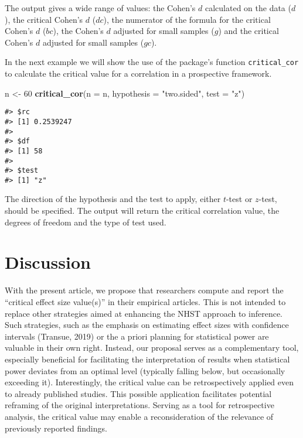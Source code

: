 \documentclass[
  man]{apa7}
\newenvironment{Shaded}{\begin{snugshade}}{\end{snugshade}}
\newcommand{\AttributeTok}[1]{\textcolor[rgb]{0.13,0.29,0.53}{#1}}
\newcommand{\DecValTok}[1]{\textcolor[rgb]{0.00,0.00,0.81}{#1}}
\newcommand{\FunctionTok}[1]{\textcolor[rgb]{0.13,0.29,0.53}{\textbf{#1}}}
\newcommand{\NormalTok}[1]{#1}
\newcommand{\OtherTok}[1]{\textcolor[rgb]{0.56,0.35,0.01}{#1}}
\newcommand{\StringTok}[1]{\textcolor[rgb]{0.31,0.60,0.02}{#1}}
\begin{document}
The output gives a wide range of values: the Cohen's \(d\) calculated on the data (\(d\)), the critical Cohen's \(d\) (\(dc\)), the numerator of the formula for the critical Cohen's \(d\) (\(bc\)), the Cohen's \(d\) adjusted for small samples (\(g\)) and the critical Cohen's \(d\) adjusted for small samples (\(gc\)).

In the next example we will show the use of the package's function \texttt{critical\_cor} to calculate the critical value for a correlation in a prospective framework.

\begin{Shaded}
\begin{Highlighting}[]
\NormalTok{n }\OtherTok{\textless{}{-}} \DecValTok{60}
\FunctionTok{critical\_cor}\NormalTok{(}\AttributeTok{n =}\NormalTok{ n, }\AttributeTok{hypothesis =} \StringTok{"two.sided"}\NormalTok{, }\AttributeTok{test =} \StringTok{"z"}\NormalTok{)}
\end{Highlighting}
\end{Shaded}

\begin{verbatim}
#> $rc
#> [1] 0.2539247
#> 
#> $df
#> [1] 58
#> 
#> $test
#> [1] "z"
\end{verbatim}

The direction of the hypothesis and the test to apply, either \(t\)-test or \(z\)-test, should be specified. The output will return the critical correlation value, the degrees of freedom and the type of test used.

\hypertarget{discussion}{%
\section{Discussion}\label{discussion}}

With the present article, we propose that researchers compute and report the ``critical effect size value(s)'' in their empirical articles. This is not intended to replace other strategies aimed at enhancing the NHST approach to inference. Such strategies, such as the emphasis on estimating effect sizes with confidence intervals (Transue, 2019) or the a priori planning for statistical power are valuable in their own right. Instead, our proposal serves as a complementary tool, especially beneficial for facilitating the interpretation of results when statistical power deviates from an optimal level (typically falling below, but occasionally exceeding it). Interestingly, the critical value can be retrospectively applied even to already published studies. This possible application facilitates potential reframing of the original interpretations. Serving as a tool for retrospective analysis, the critical value may enable a reconsideration of the relevance of previously reported findings.
\end{document}
